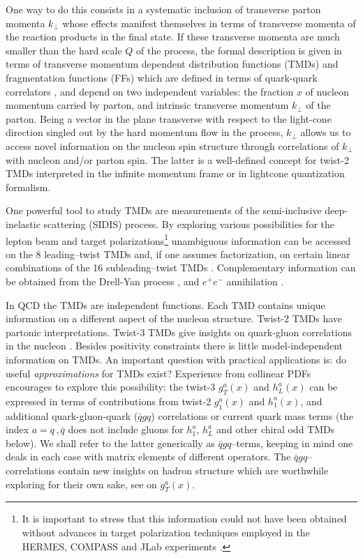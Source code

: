 \documentclass[a4paper,11pt]{article}
\newcommand{\blue}[1]{{\color{blue} #1}}
\newcommand{\darkgreen}[1]{{\color{darkgreen} #1}}
\newcommand{\ps}[1]{\blue{ #1}}
\newcommand{\ms}[1]{\darkgreen{ #1}}
\def\kperp{k_\perp}
\begin{document}
One way to do this consists in a systematic inclusion of transverse 
parton momenta $\kperp$ whose effects manifest themselves in terms of
transverse momenta of the reaction products in the final state.
If these transverse momenta are much smaller than the hard scale $Q$
of the process, the formal description is given in terms of 
transverse momentum dependent distribution functions (TMDs) 
and fragmentation functions (FFs)
which are defined in terms of quark-quark correlators 
\cite{Kotzinian:1994dv,Mulders:1995dh,Boer:1997nt,Goeke:2005hb,Bacchetta:2006tn},
and depend on two independent variables: the fraction $x$ of 
nucleon momentum carried by parton, and intrinsic transverse 
momentum $\kperp$ of the parton.
Being a vector in the plane transverse with respect to the
light-cone direction singled out by the hard momentum flow in the process,
$\kperp$ allows us to access novel information on the nucleon spin structure 
through correlations of $\kperp$ with nucleon and/or parton spin. The 
latter is a well-defined concept for twist-2 TMDs interpreted in 
the infinite momentum frame or in lightcone quantization formalism.

One powerful tool to study TMDs are measurements of the 
semi-inclusive deep-inelastic scattering (SIDIS) process.
By exploring various possibilities for the lepton beam and target 
polarizations\footnote{\ps{It is important to stress that this
	information could not have been obtained without advances 
	in target polarization techniques employed in the HERMES, 
	COMPASS and JLab experiments 
	\cite{Stock:1994vv,Crabb:1997cy,Goertz:2002vv}.}}
unambiguous information can be accessed on the 8 leading--twist 
TMDs \cite{Boer:1997nt} and, if one assumes factorization, on certain
linear combinations of the 16 subleading--twist TMDs 
\cite{Goeke:2005hb,Bacchetta:2006tn}.
Complementary information can be obtained 
from the Drell-Yan process \cite{Arnold:2008kf}, 
and $e^+e^-$ annihilation \cite{Metz:2016swz}.

In QCD the TMDs are independent functions. Each TMD contains unique
information on a different aspect of the nucleon structure. 
Twist-2 TMDs have partonic interpretations. Twist-3 TMDs 
give insights on quark-gluon correlations in the nucleon
\cite{Miller:2007ae,Burkardt:2007rv,Burkardt:2009rf}. 
Besides positivity constraints \cite{Bacchetta:1999kz} 
there is little model-independent information on TMDs. 
An important question with practical applications is:
do useful {\sl approximations} for TMDs exist? 
Experience from collinear PDFs encourages to explore this possibility: 
the twist-3 $g_T^a(x)$ and $h_L^a(x)$ can be expressed in terms of 
contributions from twist-2 $g_1^a(x)$ and $h_1^a(x)$, and additional 
quark-gluon-quark ($\bar{q}gq$) correlations or current quark mass 
terms \cite{Wandzura:1977qf,Jaffe:1991ra}
\ms{(the index $a=q\,,\bar q$ does not include gluons for
$h_1^a$, $h_L^a$ and other chiral odd TMDs below)}.
We shall refer to the latter generically as $\bar{q}gq$--terms, keeping in 
mind one deals in each case with matrix elements of different operators.
The $\bar{q}gq$--correlations contain new insights on hadron structure 
which are worthwhile exploring for their own sake, 
see \cite{Jaffe:1989xx} on $g_T^a(x)$.
\end{document}
